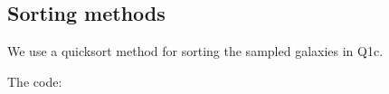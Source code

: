 \subsection{Sorting methods}

We use a quicksort method for sorting the sampled galaxies in Q1c.

\noindent The code:
